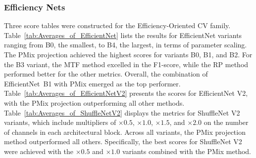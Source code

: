 \documentclass[final,3p,times,twocolumn]{elsarticle}
\begin{document}
\subsubsection{Efficiency Nets}

Three score tables were constructed for the Efficiency-Oriented \gls{CV} family.
Table~\ref{tab:Averages_of_EfficientNet} lists the results for EfficientNet variants ranging from B0, the smallest, to B4, the largest, in terms of parameter scaling. The \gls{PMix} projection achieved the highest scores for variants B0, B1, and B2. For the B3 variant, the \gls{MTF} method excelled in the F1-score, while the \gls{RP} method performed better for the other metrics. Overall, the combination of \mbox{EfficientNet B1} with \gls{PMix} emerged as the top performer.
Table~\ref{tab:Averages_of_EfficientNetV2} presents the scores for EfficientNet V2, with the \gls{PMix} projection outperforming all other methods.
Table~\ref{tab:Averages_of_ShuffleNetV2} displays the metrics for ShuffleNet V2 variants, which include multipliers of $\times 0.5$, $\times 1.0$, $\times 1.5$, and $\times 2.0$ on the number of channels in each architectural block. Across all variants, the \gls{PMix} projection method outperformed all others. Specifically, the best scores for ShuffleNet V2 were achieved with the $\times 0.5$ and $\times 1.0$ variants combined with the \gls{PMix} method.
\end{document}
